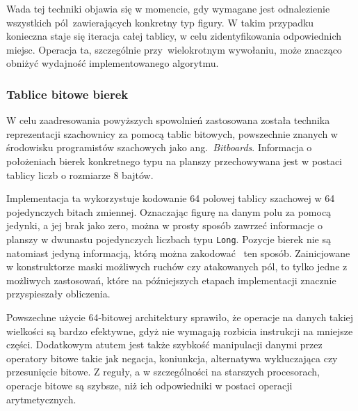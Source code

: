Wada tej techniki objawia się w momencie, gdy wymagane jest odnalezienie wszystkich pól~zawierających konkretny typ figury.
W takim przypadku konieczna staje się iteracja całej tablicy, w celu zidentyfikowania odpowiednich miejsc.
Operacja ta, szczególnie przy~wielokrotnym wywołaniu, może znacząco obniżyć wydajność implementowanego algorytmu.

%
%
%
%


\subsubsection{Tablice bitowe bierek}

W celu zaadresowania powyższych spowolnień zastosowana została technika reprezentacji szachownicy za pomocą tablic bitowych, powszechnie znanych w środowisku programistów szachowych jako ang.~\emph{Bitboards}.
Informacja o położeniach bierek konkretnego typu na planszy przechowywana jest w postaci tablicy liczb o rozmiarze 8 bajtów.

Implementacja ta wykorzystuje kodowanie 64 polowej tablicy szachowej w 64 pojedynczych bitach zmiennej.
Oznaczając figurę na danym polu za pomocą jedynki, a jej brak jako zero, można w prosty sposób zawrzeć informacje o planszy w dwunastu pojedynczych liczbach typu \texttt{Long}.
Pozycje bierek nie są natomiast jedyną informacją, którą można zakodować ~ten sposób.
Zainicjowane w konstruktorze maski możliwych ruchów czy atakowanych pól, to tylko jedne z możliwych zastosowań, które na późniejszych etapach implementacji znacznie przyspieszały obliczenia.

Powszechne użycie 64-bitowej architektury sprawiło, że operacje na danych takiej wielkości są bardzo efektywne, gdyż nie wymagają rozbicia instrukcji na mniejsze części.
Dodatkowym atutem jest także szybkość manipulacji danymi przez operatory bitowe takie jak negacja, koniunkcja, alternatywa wykluczająca czy przesunięcie bitowe.
Z reguły, a w szczególności na starszych procesorach, operacje bitowe są szybsze, niż ich odpowiedniki w postaci operacji arytmetycznych.

%

